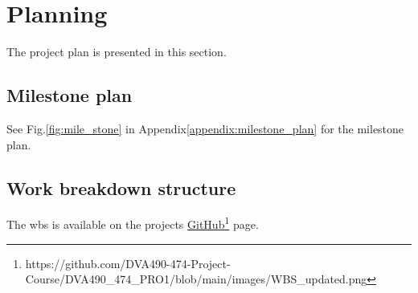 \section{Planning}
\label{section:planning}

The project plan is presented in this section.

\subsection{Milestone plan}

See Fig.\:\ref{fig:mile_stone} in Appendix\:\ref{appendix:milestone_plan} for the milestone plan.



\subsection{Work breakdown structure}

The \ac{wbs} is available on the projects \href{https://github.com/DVA490-474-Project-Course/DVA490_474_PRO1/blob/main/images/WBS_updated.png}{GitHub}\footnote{https://github.com/DVA490-474-Project-Course/DVA490\_474\_PRO1/blob/main/images/WBS\_updated.png} page.


